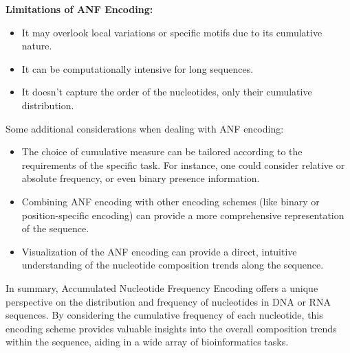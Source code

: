\noindent
\textbf{Limitations of ANF Encoding:}
\begin{itemize}
  \item It may overlook local variations or specific motifs due to its cumulative
  nature.
  \item It can be computationally intensive for long sequences.
  \item It doesn't capture the order of the nucleotides, only their cumulative
  distribution.
\end{itemize}

\noindent
Some additional considerations when dealing with ANF encoding:

\begin{itemize}
  \item The choice of cumulative measure can be tailored according to the
  requirements of the specific task. For instance, one could consider relative
  or absolute frequency, or even binary presence information.
  \item Combining ANF encoding with other encoding schemes (like binary or
  position-specific encoding) can provide a more comprehensive representation of
  the sequence.
  \item Visualization of the ANF encoding can provide a direct, intuitive
  understanding of the nucleotide composition trends along the sequence.
\end{itemize}

\noindent
In summary, Accumulated Nucleotide Frequency Encoding offers a unique perspective
on the distribution and frequency of nucleotides in DNA or RNA sequences. By
considering the cumulative frequency of each nucleotide, this encoding scheme
provides valuable insights into the overall composition trends within the sequence,
aiding in a wide array of bioinformatics tasks.
